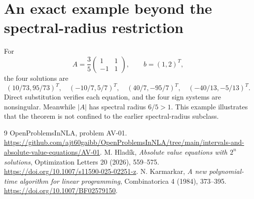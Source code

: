 \documentclass[11pt,a4paper]{article}
\theoremstyle{remark}\newtheorem{remark}[theorem]{Remark}
\newcommand{\repo}[1]{\url{https://github.com/ajt60gaibb/OpenProblemsInNLA/tree/main/intervals-and-absolute-value-equations/#1}}
\begin{document}
\section{An exact example beyond the spectral-radius restriction}
For
\[
 A=\frac35\begin{pmatrix}1&1\\-1&1\end{pmatrix},\qquad b=(1,2)^T,
\]
the four solutions are
\[
 (10/73,95/73)^T,\quad(-10/7,5/7)^T,\quad
 (40/7,-95/7)^T,\quad(-40/13,-5/13)^T.
\]
Direct substitution verifies each equation, and the four sign systems are
nonsingular. Meanwhile $|A|$ has spectral radius $6/5>1$. This example
illustrates that the theorem is not confined to the earlier spectral-radius
subclass.

\begin{thebibliography}{9}
 OpenProblemsInNLA, problem AV-01. \repo{AV-01}.
 M. Hlad\'ik, \emph{Absolute value equations with $2^n$ solutions}, Optimization Letters 20 (2026), 559--575. \url{https://doi.org/10.1007/s11590-025-02251-z}.
 N. Karmarkar, \emph{A new polynomial-time algorithm for linear programming}, Combinatorica 4 (1984), 373--395. \url{https://doi.org/10.1007/BF02579150}.
\end{thebibliography}
\end{document}

